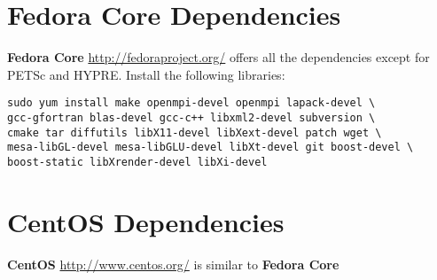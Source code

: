 \documentclass[11pt,fleqn]{book} %
\begin{document}


  

\section{Fedora Core  Dependencies}

\textbf{Fedora Core} \url{http://fedoraproject.org/} offers all the
dependencies except for PETSc and HYPRE.  Install the following
libraries:

\begin{lstlisting}
sudo yum install make openmpi-devel openmpi lapack-devel \
gcc-gfortran blas-devel gcc-c++ libxml2-devel subversion \ 
cmake tar diffutils libX11-devel libXext-devel patch wget \
mesa-libGL-devel mesa-libGLU-devel libXt-devel git boost-devel \
boost-static libXrender-devel libXi-devel
\end{lstlisting} 


\section{CentOS  Dependencies}

\textbf{CentOS} \url{http://www.centos.org/} is similar to \textbf{Fedora
Core} 
\end{document}
